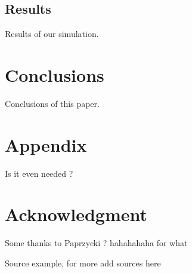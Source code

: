 \documentclass[conference]{IEEEtran}
\begin{document}








\subsection{Results}
Results of our simulation.








\section{Conclusions}
Conclusions of this paper.











\balance




\section*{Appendix}
Is it even needed ?

\section*{Acknowledgment}
Some thanks to Paprzycki ? hahahahaha for what


\begin{thebibliography}{99}

Source example, for more add sources here

\end{thebibliography}
\end{document}
